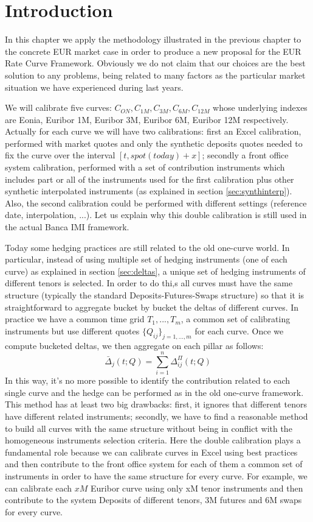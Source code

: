 \section{Introduction}

In this chapter we apply the methodology illustrated in the previous chapter to the concrete EUR market case in order to produce a new proposal for the EUR Rate Curve Framework. Obviously we do not claim that our choices are the best solution to any problems, being related to many factors as the particular market situation we have experienced during last years. 

We will calibrate five curves: $C_{ON}, C_{1M}, C_{3M}, C_{6M}, C_{12M}$ whose underlying indexes are Eonia, Euribor 1M, Euribor 3M, Euribor 6M, Euribor 12M respectively. Actually for each curve we will have two calibrations: first an Excel calibration, performed with market quotes and only the synthetic deposits quotes needed to fix the curve over the interval $[t,spot(today)+x]$; secondly a front office system calibration, performed with a set of contribution instruments which includes part or all of the instruments used for the first calibration plus other synthetic interpolated instruments (as explained in section \ref{sec:synthinterp}). Also, the second calibration could be performed with different settings (reference date, interpolation, ...). Let us explain why this double calibration is still used in the actual Banca IMI framework.

Today some hedging practices are still related to the old one-curve world. In particular, instead of using multiple set of hedging instruments (one of each curve) as explained in section \ref{sec:deltas}, a unique set of hedging instruments of different tenors is selected. In order to do thi,s all curves must have the same structure (typically the standard Deposits-Futures-Swaps structure) so that it is straightforward to aggregate bucket by bucket the deltas of different curves. In practice we have a common time grid $T_{1},...,T_{m}$, a common set of calibrating instruments but use different quotes $\{Q_{ij}\}_{j=1,...,m}$ for each curve. Once we compute bucketed deltas, we then aggregate on each pillar as follows:
$$\bar{\Delta}_{j}(t;Q)=\sum_{i=1}^{n}\Delta^{\Pi}_{ij}(t;Q)$$
In this way, it's no more possible to identify the contribution related to each single curve and the hedge can be performed as in the old one-curve framework. This method has at least two big drawbacks: first, it ignores that different tenors have different related instruments; secondly, we have to find a reasonable method to build all curves with the same structure without being in conflict with the homogeneous instruments selection criteria. Here the double calibration plays a fundamental role because we can calibrate curves in Excel using best practices and then contribute to the front office system for each of them a common set of instruments in order to have the same structure for every curve. For example, we can calibrate each $xM$ Euribor curve using only xM tenor instruments and then contribute to the system Deposits of different tenors, 3M futures and 6M swaps for every curve. 


